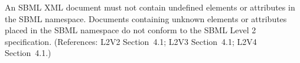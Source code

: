 An SBML XML document must not contain undefined elements or
attributes in the SBML namespace.  Documents containing unknown
elements or attributes placed in the SBML namespace do not conform
to the SBML Level 2 specification.  (References: L2V2 Section~4.1;
L2V3 Section~4.1; L2V4 Section~4.1.)
